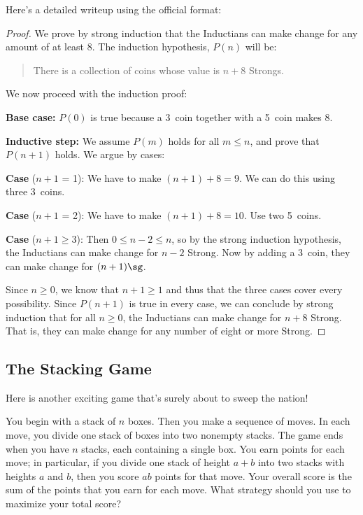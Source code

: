 Here's a detailed writeup using the official format:

\begin{proof}

  We prove by strong induction that the Inductians can make change for any
  amount of at least 8\sg.  The induction hypothesis, $P(n)$ will be:
\begin{quote}
There is a collection of coins whose value is $n+8$ Strongs.
\end{quote}

We now proceed with the induction proof:

\textbf{Base case:} $P(0)$ is true because a 3\sg\ coin together with
a 5\sg\ coin makes 8\sg.

\textbf{Inductive step:}  We assume $P(m)$ holds for all $m \leq n$, and
prove that $P(n+1)$ holds.  We argue by cases:

\textbf{Case} ($n+1$ = 1): We have to make $(n+1) +8 =9$\sg.  We can do this using three 3\sg\ coins.

\textbf{Case} ($n+1$ = 2): We have to make $(n+1) +8 =10$\sg.  Use two
5\sg\ coins.

\textbf{Case} ($n+1 \geq 3$): Then $0 \leq n - 2 \leq n$, so by the
strong induction hypothesis, the Inductians can make change for $n-2$
Strong.  Now by adding a 3\sg\ coin, they can make change for
$(n+1)\sg$.

Since $n \ge 0$, we know that $n + 1 \ge 1$ and thus that the three cases
cover every possibility.  Since $P(n+1)$ is true in every case, we can
conclude by strong induction
that for all $n \ge 0$, the Inductians can make change for $n+8$
Strong.  That is, they can make change for any number of eight or more
Strong.
\end{proof}

\subsection{The Stacking Game}

Here is another exciting game that's surely about to sweep the
nation!

You begin with a stack of $n$ boxes.  Then you
make a sequence of moves.  In each move, you divide one stack of boxes
into two nonempty stacks.  The game ends when you have $n$ stacks, each
containing a single box.  You earn points for each move; in particular, if
you divide one stack of height $a + b$ into two stacks with heights $a$
and $b$, then you score $ab$ points for that move.  Your overall score is
the sum of the points that you earn for each move.  What strategy should
you use to maximize your total score?

